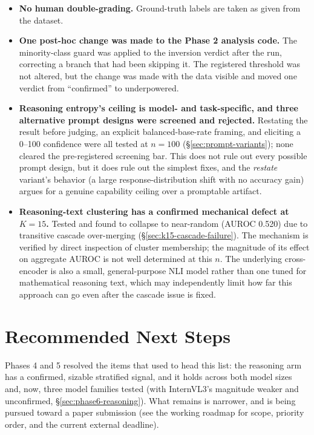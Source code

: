 \documentclass[11pt]{article}
\begin{document}
\begin{itemize}
    42\%. This biases the reported accuracy conservatively, not favorably.
  \item \textbf{No human double-grading.} Ground-truth labels are taken as
    given from the dataset.
  \item \textbf{One post-hoc change was made to the Phase 2 analysis code.}
    The minority-class guard was applied to the inversion verdict after the run,
    correcting a branch that had been skipping it. The registered threshold was
    not altered, but the change was made with the data visible and moved one
    verdict from ``confirmed'' to underpowered.
  \item \textbf{Reasoning entropy's ceiling is model- and task-specific, and
    three alternative prompt designs were screened and rejected.} Restating
    the result before judging, an explicit balanced-base-rate framing, and
    eliciting a 0--100 confidence were all tested at $n=100$
    (\S\ref{sec:prompt-variants}); none cleared the pre-registered screening
    bar. This does not rule out every possible prompt design, but it does
    rule out the simplest fixes, and the \emph{restate} variant's behavior
    (a large response-distribution shift with no accuracy gain) argues for a
    genuine capability ceiling over a promptable artifact.
  \item \textbf{Reasoning-text clustering has a confirmed mechanical defect at
    $K=15$.} Tested and found to collapse to near-random (AUROC 0.520) due to
    transitive cascade over-merging (\S\ref{sec:k15-cascade-failure}). The
    mechanism is verified by direct inspection of cluster membership; the
    magnitude of its effect on aggregate AUROC is not well determined at this
    $n$. The underlying cross-encoder is also a small, general-purpose NLI
    model rather than one tuned for mathematical reasoning text, which may
    independently limit how far this approach can go even after the cascade
    issue is fixed.
\end{itemize}

\section{Recommended Next Steps}

Phases 4 and 5 resolved the items that used to head this list: the
reasoning arm has a confirmed, sizable stratified signal, and it holds
across both model sizes and, now, three model families tested (with
InternVL3's magnitude weaker and unconfirmed, \S\ref{sec:phase6-reasoning}).
What remains is narrower, and is being pursued toward a paper submission
(see the working roadmap for scope, priority order, and the current
external deadline).
\end{document}

